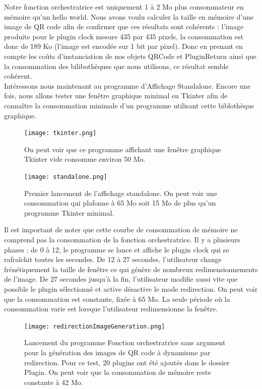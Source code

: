 \documentclass[a4paper,12pt]{article}
\begin{document}
\noindent Notre fonction orchestratrice est uniquement 1 à 2 Mo plus consommateur en mémoire qu'un hello world. Nous avons voulu calculer la taille en mémoire d'une image de QR code afin de confirmer que ces résultats sont cohérents : l'image produite pour le plugin clock mesure 435 par 435 pixels, la consommation est donc de 189 Ko (l'image est encodée sur 1 bit par pixel). Donc en prenant en compte les coûts d'instanciation de nos objets QRCode et PluginReturn ainsi que la consommation des bilibothèques que nous utilisons, ce résultat semble cohérent.\\

\noindent Intéressons nous maintenant au programme d'Affichage Standalone.
Encore une fois, nous allons tester une fenêtre graphique minimal en Tkinter afin de connaître la consommation minimale d'un programme utilisant cette biblothèque graphique.

\begin{figure}[H]
\begin{center}
  \texttt{[image: tkinter.png]}
  \caption{On peut voir que ce programme affichant une fenêtre graphique Tkinter vide consomme environ 50 Mo.}
\end{center}
\end{figure}


\begin{figure}[H]
\begin{center}
  \texttt{[image: standalone.png]}
  \caption{Premier lancement de l'affichage standalone. On peut voir une consommation qui plafonne à 65 Mo soit 15 Mo de plus qu'un programme Tkinter minimal.}
\end{center}
\end{figure}
\newpage
\noindent Il est important de noter que cette courbe de consommation de mémoire ne comprend pas la consommation de la fonction orchestratrice.
Il y a plusieurs phases : de 0 à 12, le programme se lance et affiche le plugin clock qui se rafraîchit toutes les secondes. De 12 à 27 secondes, l'utilisateur change frénétiquement la taille de fenêtre ce qui génère de nombreux redimensionnements de l'image. De 27 secondes jusqu'à la fin, l'utilisateur modifie aussi vite que possible le plugin sélectionné et active désactive le mode redirection.
On peut voir que la consommation est constante, fixée à 65 Mo. La seule période où la consommation varie est lorsque l'utilisateur redimensionne la fenêtre. 

\begin{figure}[H]
\begin{center}
  \texttt{[image: redirectionImageGeneration.png]}
  \caption{Lancement du programme Fonction orchestratrice sans argument pour la génération des images de QR code à dynamisme par redirection. Pour ce test, 20 plugins ont été ajoutés dans le dossier Plugin. On peut voir que la consommation de mémoire reste constante à 42 Mo.}
\end{center}
\end{figure}
\end{document}
